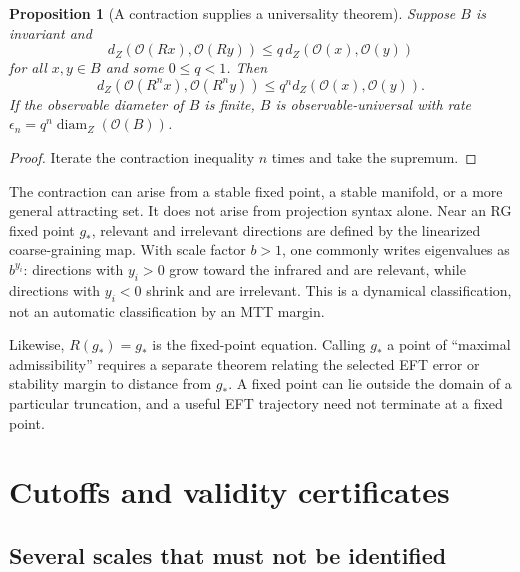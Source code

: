 \documentclass[11pt]{article}
\newtheorem{proposition}[theorem]{Proposition}
\theoremstyle{definition}
\theoremstyle{remark}
\newcommand{\diam}{\operatorname{diam}}
\begin{document}
\begin{proposition}[A contraction supplies a universality theorem]
\label{prop:contraction}
Suppose \(B\) is invariant and
\[
 d_Z\!\left(\mathcal O(Rx),\mathcal O(Ry)\right)
 \leq q\,
 d_Z\!\left(\mathcal O(x),\mathcal O(y)\right)
\]
for all \(x,y\in B\) and some \(0\leq q<1\).  Then
\[
 d_Z\!\left(\mathcal O(R^nx),\mathcal O(R^ny)\right)
 \leq
 q^n d_Z\!\left(\mathcal O(x),\mathcal O(y)\right).
\]
If the observable diameter of \(B\) is finite, \(B\) is
observable-universal with rate
\(\epsilon_n=q^n\diam_Z(\mathcal O(B))\).
\end{proposition}

\begin{proof}
Iterate the contraction inequality \(n\) times and take the supremum.
\end{proof}

The contraction can arise from a stable fixed point, a stable manifold, or a
more general attracting set.  It does not arise from projection syntax alone.
Near an RG fixed point \(g_\ast\), relevant and irrelevant directions are
defined by the linearized coarse-graining map.  With scale factor \(b>1\),
one commonly writes eigenvalues as \(b^{y_i}\): directions with \(y_i>0\)
grow toward the infrared and are relevant, while directions with \(y_i<0\)
shrink and are irrelevant.  This is a dynamical classification, not an
automatic classification by an MTT margin.

Likewise, \(R(g_\ast)=g_\ast\) is the fixed-point equation.  Calling
\(g_\ast\) a point of ``maximal admissibility'' requires a separate theorem
relating the selected EFT error or stability margin to distance from
\(g_\ast\).  A fixed point can lie outside the domain of a particular
truncation, and a useful EFT trajectory need not terminate at a fixed point.

\section{Cutoffs and validity certificates}
\label{sec:certificate}

\subsection{Several scales that must not be identified}
\end{document}
